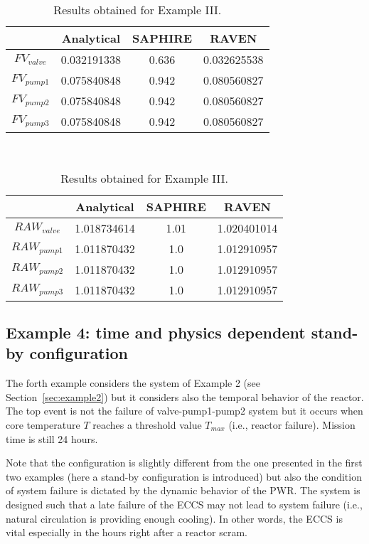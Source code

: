 \begin{table}
    \caption{Results obtained for Example III.}
    \begin{minipage}{.5\linewidth}
      \centering
      \begin{tabular}{c | c | c | c} 
        \hline 
         & Analytical & SAPHIRE & RAVEN \\ 
        \hline 
        $FV_{valve}$ & 0.032191338 & 0.636 & 0.032625538  \\
        $FV_{pump1}$ & 0.075840848 & 0.942 & 0.080560827  \\
        $FV_{pump2}$ & 0.075840848 & 0.942 & 0.080560827  \\
        $FV_{pump3}$ & 0.075840848 & 0.942 & 0.080560827  \\ 
        \hline 
      \end{tabular}
    \end{minipage} \\
    \begin{minipage}{.5\linewidth}
      \centering
      \begin{tabular}{c | c | c | c} 
        \hline 
         & Analytical & SAPHIRE & RAVEN \\ 
        \hline 
        $RAW_{valve}$ & 1.018734614 & 1.01 & 1.020401014 \\
        $RAW_{pump1}$ & 1.011870432 & 1.0 & 1.012910957  \\
        $RAW_{pump2}$ & 1.011870432 & 1.0 & 1.012910957  \\
        $RAW_{pump3}$ & 1.011870432 & 1.0 & 1.012910957  \\ 
        \hline 
      \end{tabular}
    \end{minipage} 
    \label{tab:example3}
\end{table}


\subsection{Example 4: time and physics dependent stand-by configuration}
\label{sec:example4}

The forth example considers the system of Example 2 (see Section~\ref{sec:example2}) but it considers 
also the temporal behavior of the reactor.
The top event is not the failure of valve-pump1-pump2 system but it occurs when core temperature $T$
reaches a threshold value $T_{max}$ (i.e., reactor failure). 
Mission time is still 24 hours.

Note that the configuration is slightly different from the one presented in the first two 
examples (here a stand-by configuration is introduced) but also the condition of system failure 
is dictated by the dynamic behavior of the PWR. The system is designed such that a late failure 
of the ECCS may not lead to system failure (i.e., natural circulation is providing enough cooling). 
In other words, the ECCS is vital especially in the hours right after a reactor scram.

